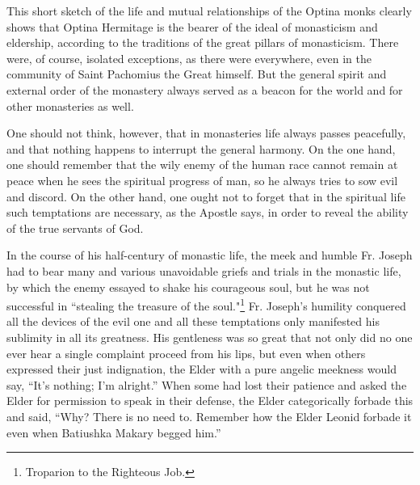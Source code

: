 This short sketch of the life and mutual relationships of the Optina monks clearly shows that Optina Hermitage is the bearer of the ideal of monasticism and eldership, according to the traditions of the great pillars of monasticism. There were, of course, isolated exceptions, as there were everywhere, even in the community of Saint Pachomius the Great himself. But the general spirit and external order of the monastery always served as a beacon for the world and for other monasteries as well.

One should not think, however, that in monasteries life always passes peacefully, and that nothing happens to interrupt the general harmony. On the one hand, one should remember that the wily enemy of the human race cannot remain at peace when he sees the spiritual progress of man, so he always tries to sow evil and discord. On the other hand, one ought not to forget that in the spiritual life such temptations are necessary, as the Apostle says, in order to reveal the ability of the true servants of God.

In the course of his half-century of monastic life, the meek and humble Fr. Joseph had to bear many and various unavoidable griefs and trials in the monastic life, by which the enemy essayed to shake his courageous soul, but he was not successful in “stealing the treasure of the soul."\footnote{Troparion to the Righteous Job.} Fr. Joseph's humility conquered all the devices of the evil one and all these temptations only manifested his sublimity in all its greatness. His gentleness was so great that not only did no one ever hear a single complaint proceed from his lips, but even when others expressed their just indignation, the Elder with a pure angelic meekness would say, “It's nothing; I'm alright.” When some had lost their patience and asked the Elder for permission to speak in their defense, the Elder categorically forbade this and said, “Why? There is no need to. Remember how the Elder Leonid forbade it even when Batiushka Makary begged him.”